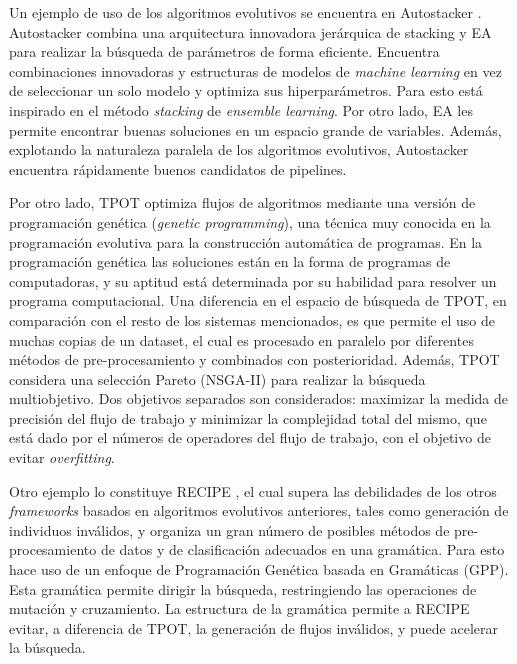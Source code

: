 Un ejemplo de uso de los algoritmos evolutivos se encuentra en Autostacker \cite{chen2018autostacker}. Autostacker combina una arquitectura innovadora jerárquica de stacking y EA para realizar la búsqueda de parámetros de forma eficiente. Encuentra combinaciones innovadoras y estructuras de modelos de \textit{machine learning} en vez de seleccionar un solo modelo y optimiza sus hiperparámetros. Para esto está inspirado en el método \textit{stacking} de \textit{ensemble learning}. Por otro lado, EA les permite encontrar buenas soluciones en un espacio grande de variables. Además, explotando la naturaleza paralela de los algoritmos evolutivos, Autostacker encuentra rápidamente buenos candidatos de pipelines.

Por otro lado, TPOT \cite{olson2019tpot} optimiza flujos de algoritmos mediante una versión de programación genética (\textit{genetic programming}), una técnica muy conocida en la programación evolutiva para la construcción automática de programas. En la programación genética las soluciones están en la forma de programas de computadoras, y su aptitud está determinada por su habilidad para resolver un programa computacional. Una diferencia en el espacio de búsqueda de TPOT, en comparación con el resto de los sistemas mencionados, es que permite el uso de muchas copias de un dataset, el cual es procesado en paralelo por diferentes métodos de pre-procesamiento y combinados con posterioridad. Además, TPOT considera una selección Pareto (NSGA-II) \cite{NSGA-II} para realizar la búsqueda multiobjetivo. Dos objetivos separados son considerados: maximizar la medida de precisión del flujo de trabajo y minimizar la complejidad total del mismo, que está dado por el números de operadores del flujo de trabajo, con el objetivo de evitar \textit{overfitting}.

Otro ejemplo lo constituye RECIPE \cite{de2017recipe}, el cual supera las debilidades de los otros \textit{frameworks} basados en algoritmos evolutivos anteriores, tales como generación de individuos inválidos, y organiza un gran número de posibles métodos de pre-procesamiento de datos y de clasificación adecuados en una gramática. Para esto hace uso de un enfoque de Programación Genética basada en Gramáticas (GPP). Esta gramática permite dirigir la búsqueda, restringiendo las operaciones de mutación y cruzamiento. La estructura de la gramática permite a RECIPE evitar, a diferencia de TPOT, la generación de flujos inválidos, y puede acelerar la búsqueda.

